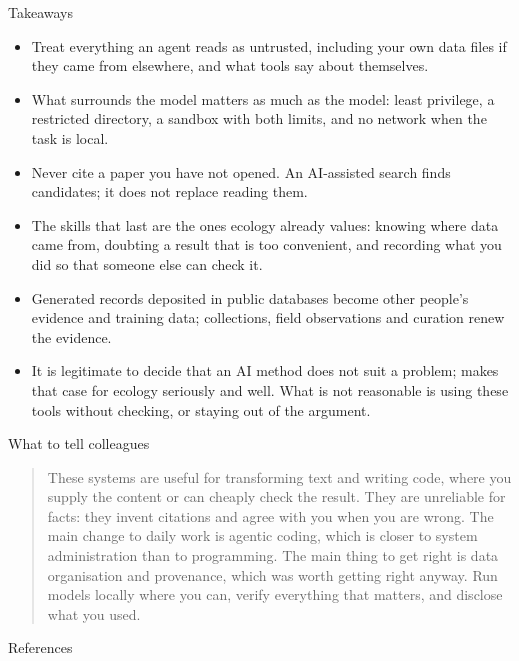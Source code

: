 \documentclass[11pt,aspectratio=169]{beamer}
\begin{document}
\begin{frame}{Takeaways}
  \begin{itemize}
    \item Treat everything an agent reads as untrusted, including your own
      data files if they came from elsewhere, and what tools say about
      themselves.
    \item What surrounds the model matters as much as the model: least
      privilege, a restricted directory, a sandbox with both limits, and no
      network when the task is local.
    \item Never cite a paper you have not opened. An AI-assisted search finds
      candidates; it does not replace reading them.
    \item The skills that last are the ones ecology already values: knowing
      where data came from, doubting a result that is too convenient, and
      recording what you did so that someone else can check it.
    \item Generated records deposited in public databases become other
      people's evidence and training data; collections, field observations and
      curation renew the evidence.
    \item It is legitimate to decide that an AI method does not suit a
      problem; \textcite{mishra2026notready} makes that case for ecology
      seriously and well. What is not reasonable is using these tools without
      checking, or staying out of the argument.
  \end{itemize}
\end{frame}

\begin{frame}{What to tell colleagues}
  \begin{quote}
    These systems are useful for transforming text and writing code, where
    you supply the content or can cheaply check the result. They are
    unreliable for facts: they invent citations and agree with you when you
    are wrong. The main change to daily work is agentic coding, which is
    closer to system administration than to programming. The main thing to
    get right is data organisation and provenance, which was worth getting
    right anyway. Run models locally where you can, verify everything that
    matters, and disclose what you used.
  \end{quote}
\end{frame}

\begin{frame}[allowframebreaks]{References}
  \printbibliography[heading=none]
\end{frame}
\end{document}
